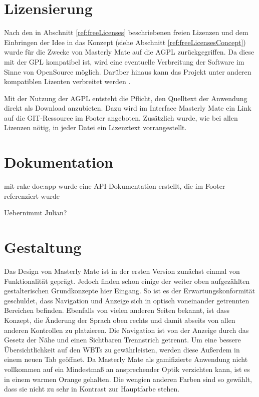 \section{Lizensierung}
Nach den in Abschnitt \ref{ref:freeLicenses} beschriebenen freien Lizenzen und
dem Einbringen der Idee in das Konzept (siehe Abschnitt
\ref{ref:freeLicensesConcept}) wurde für die Zwecke von Masterly Mate auf die
\ac{AGPL} zurückgegriffen. Da diese mit der \ac{GPL} kompatibel ist, wird
eine eventuelle Verbreitung der Software im Sinne von OpenSource möglich.
Darüber hinaus kann das Projekt unter anderen kompatiblen Lizenten verbreitet
werden \cite{fsf:2007}.

Mit der Nutzung der AGPL entsteht die Pflicht, den Quelltext der Anwendung
direkt als Download anzubieten. Dazu wird im Interface Masterly Mate
ein Link auf die GIT-Ressource im Footer angeboten. Zusätzlich wurde, wie bei
allen Lizenzen nötig, in jeder Datei ein Lizenztext vorrangestellt.

\section{Dokumentation}
\begin{k}
mit rake doc:app wurde eine API-Dokumentation erstellt, die im Footer
referenziert wurde

Uebernimmt Julian?
\end{k}

\section{Gestaltung}
Das Design von Masterly Mate ist in der ersten Version zunächst einmal von
Funktionalität geprägt. Jedoch finden schon einige der weiter oben aufgezählten
gestalterischen Grundkonzepte hier Eingang. So ist es der Erwartungskonformität
geschuldet, dass Navigation und Anzeige sich in optisch voneinander getrennten
Bereichen befinden. Ebenfalls von vielen anderen Seiten bekannt, ist dass
Konzept, die Änderung der Sprach oben rechts und damit abseits von allen anderen
Kontrollen zu platzieren. Die Navigation ist von der Anzeige durch das Gesetz
der Nähe und einen Sichtbaren Trennstrich getrennt. Um eine bessere
Übersichtlichkeit auf den WBTs zu gewährleisten, werden diese Außerdem in einem
neuen Tab geöffnet. Da Masterly Mate als gamifizierte Anwendung nicht vollkommen
auf ein Mindestmaß an ansprechender Optik verzichten kann, ist es in einem
warmen Orange gehalten. Die wengien anderen Farben sind so gewählt, dass sie
nicht zu sehr in Kontrast zur Hauptfarbe stehen.

